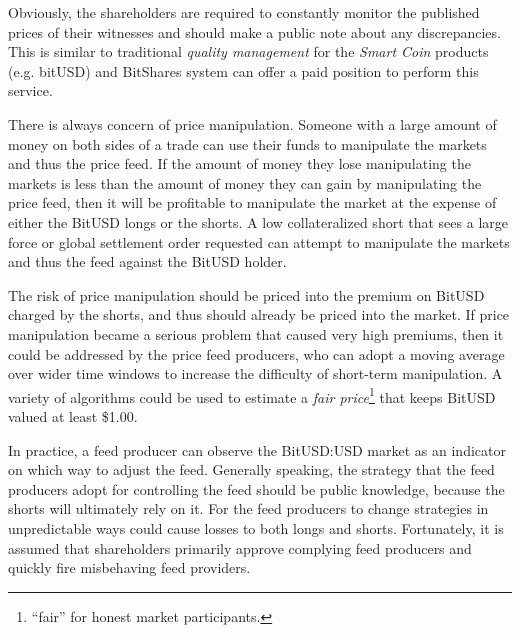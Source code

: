 

Obviously, the shareholders are required to constantly monitor the published
prices of their witnesses and should make a public note about any
discrepancies. This is similar to traditional \emph{quality management} for the
\emph{Smart Coin} products (e.g. bitUSD) and BitShares system can offer a paid
position to perform this service.

There is always concern of price manipulation. Someone with a large amount of
money on both sides of a trade can use their funds to manipulate the markets
and thus the price feed. If the amount of money they lose manipulating the
markets is less than the amount of money they can gain by manipulating the
price feed, then it will be profitable to manipulate the market at the expense
of either the BitUSD longs or the shorts. A low collateralized short that sees
a large force or global settlement order requested can attempt to manipulate
the markets and thus the feed against the BitUSD holder.

The risk of price manipulation should be priced into the premium on BitUSD
charged by the shorts, and thus should already be priced into the market. If
price manipulation became a serious problem that caused very high premiums,
then it could be addressed by the price feed producers, who can adopt a moving
average over wider time windows to increase the difficulty of short-term
manipulation. A variety of algorithms could be used to estimate a \emph{fair
price}\footnote{``fair'' for honest market participants.} that keeps BitUSD
valued at least \$1.00.

In practice, a feed producer can observe the BitUSD:USD market as an indicator
on which way to adjust the feed. Generally speaking, the strategy that the feed
producers adopt for controlling the feed should be public knowledge, because
the shorts will ultimately rely on it. For the feed producers to change
strategies in unpredictable ways could cause losses to both longs and shorts.
Fortunately, it is assumed that shareholders primarily approve complying feed
producers and quickly fire misbehaving feed providers.


